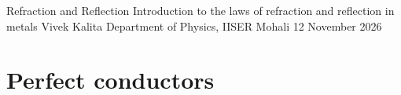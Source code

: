 \documentclass[10pt,a4paper]{article}
\begin{document}
\makemathtitle
    {Refraction and Reflection}
    {Introduction to the laws of refraction and reflection in metals}
    {Vivek Kalita}
    {Department of Physics, IISER Mohali}
    {12 November 2026}

\tableofcontents

\section{Perfect conductors}
 
\end{document}
